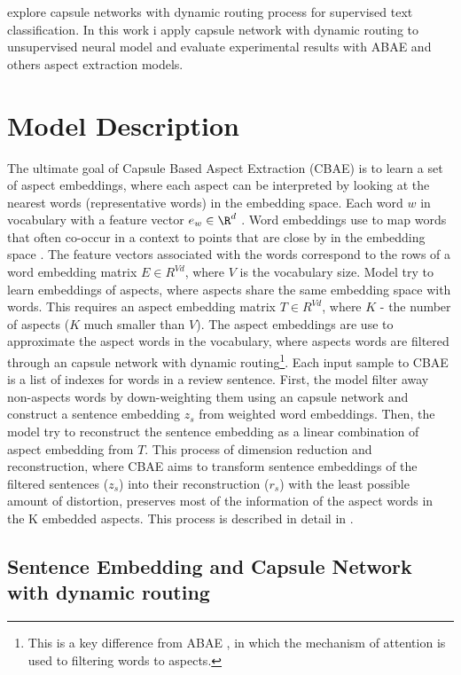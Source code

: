 \documentclass{article}
\begin{document}
\cite{Zhao2018} explore capsule networks with dynamic routing process \cite{Hinton2017DRBC} for supervised text classification. In this work i apply capsule network with dynamic routing to unsupervised neural model and evaluate experimental results with ABAE and others aspect extraction models. 

\section{Model Description}

The ultimate goal of Capsule Based Aspect Extraction (CBAE) is to learn a set of aspect embeddings, where each aspect can be interpreted by looking at the nearest words (representative words) in the embedding space. Each word $w$ in vocabulary with a feature vector $e_w \in \R^d$ \cite{He2018ABAE}. Word embeddings use to map words that often co-occur in a context to points that are close by in the embedding space \cite{Mikolov2013W2V}. The feature vectors associated with the words correspond to the rows of a word embedding matrix $E \in R^{Vd}$, where $V$ is the vocabulary size. Model try to learn embeddings of aspects, where aspects share the same embedding space with words. This requires an aspect embedding matrix $T \in R^{Vd}$, where $K$ - the number of aspects ($K$ much smaller than $V$). The aspect embeddings are use to approximate the aspect words in the vocabulary, where aspects words are filtered through an capsule network with dynamic routing\footnote{This is a key difference from ABAE \cite{He2018ABAE} , in which the mechanism of attention is used to filtering words to aspects.}.
Each input sample to CBAE is a list of indexes for words in a review sentence. First, the model filter away non-aspects words by down-weighting them using an capsule network and construct a sentence embedding $z_s$ from weighted word embeddings. Then, the model try to reconstruct the sentence embedding as a linear combination of aspect embedding from $T$. This process of dimension reduction and reconstruction, where CBAE aims to transform sentence embeddings of the filtered sentences ($z_s$) into their reconstruction ($r_s$) with the least possible amount of distortion, preserves most of the information of the aspect words in the K embedded aspects. This process is described in detail in \cite{He2018ABAE}.

\subsection{Sentence Embedding and Capsule Network with dynamic routing}
\end{document}
